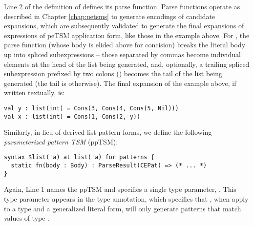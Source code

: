 Line 2 of the definition of  defines its parse function. Parse functions operate as described in Chapter \ref{chap:uetsms} to generate encodings of candidate expansions, which are subsequently validated to generate the final expansions of expressions of peTSM application form, like those in the example above. For , the parse function (whose body is elided above for concision) breaks the literal body up into  spliced subexpressions -- those separated by commas become individual elements at the head of the list being generated, and, optionally, a trailing spliced subexpression prefixed by two colons () becomes the tail of the list being generated (the tail is  otherwise). The final expansion of the example above, if written textually, is:
\begin{lstlisting}[numbers=none]
val y : list(int) = Cons(3, Cons(4, Cons(5, Nil)))
val x : list(int) = Cons(1, Cons(2, y))
\end{lstlisting}

Similarly, in lieu of derived list pattern forms, we define the following \emph{parameterized pattern TSM} (ppTSM):
\begin{lstlisting}[numbers=none]
syntax $list('a) at list('a) for patterns {
  static fn(body : Body) : ParseResult(CEPat) => (* ... *)
}
\end{lstlisting}
Again, Line 1 names the ppTSM  and specifies a single type parameter, . This type parameter appears in the type annotation, which specifies that , when apply to a type  and a generalized literal form, will only generate patterns that match values of type . 

